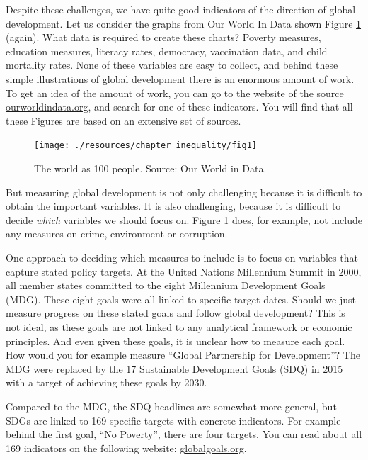 \documentclass[
]{book}
\begin{document}
Despite these challenges, we have quite good indicators of the direction of global development. Let us consider the graphs from Our World In Data shown Figure \ref{fig:poverty4} (again). What data is required to create these charts? Poverty measures, education measures, literacy rates, democracy, vaccination data, and child mortality rates. None of these variables are easy to collect, and behind these simple illustrations of global development there is an enormous amount of work. To get an idea of the amount of work, you can go to the website of the source \href{https://www.ourworldindata.org}{ourworldindata.org}, and search for one of these indicators. You will find that all these Figures are based on an extensive set of sources.

\begin{figure}

{\centering \texttt{[image: ./resources/chapter\_inequality/fig1]} 

}

\caption{The world as 100 people. Source: Our World in Data. }\label{fig:poverty4}
\end{figure}

But measuring global development is not only challenging because it is difficult to obtain the important variables. It is also challenging, because it is difficult to decide \emph{which} variables we should focus on. Figure \ref{fig:poverty4} does, for example, not include any measures on crime, environment or corruption.

One approach to deciding which measures to include is to focus on variables that capture stated policy targets. At the United Nations Millennium Summit in 2000, all member states committed to the eight Millennium Development Goals (MDG). These eight goals were all linked to specific target dates. Should we just measure progress on these stated goals and follow global development? This is not ideal, as these goals are not linked to any analytical framework or economic principles. And even given these goals, it is unclear how to measure each goal. How would you for example measure ``Global Partnership for Development''? The MDG were replaced by the 17 Sustainable Development Goals (SDQ) in 2015 with a target of achieving these goals by 2030.

Compared to the MDG, the SDQ headlines are somewhat more general, but SDGs are linked to 169 specific targets with concrete indicators. For example behind the first goal, ``No Poverty'', there are four targets. You can read about all 169 indicators on the following website: \href{https://www.globalgoals.org}{globalgoals.org}.
\end{document}
